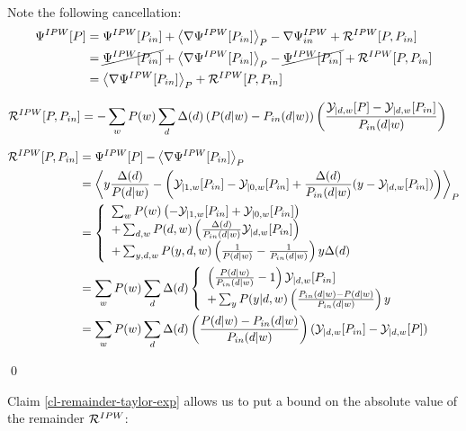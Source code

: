 Note the following cancellation:
\begin{align}
\Psi^{IPW}[P] &=
\Psi^{IPW}[P_{in}]
 + \left\langle\nabla\Psi^{IPW}[P_{in}]\right\rangle_P -\nabla\Psi^{IPW}_{in}
 + {\cal R}^{IPW}[P,P_{in}]
\\
&=
\cancel{\Psi^{IPW}[P_{in}] }
 + \left\langle\nabla\Psi^{IPW}[P_{in}]\right\rangle_P -\cancel{\Psi^{IPW}[P_{in}] }
 + {\cal R}^{IPW}[P,P_{in}]
 \\
&=
 \left\langle\nabla\Psi^{IPW}[P_{in}]\right\rangle_P
 + {\cal R}^{IPW}[P,P_{in}]
\end{align}

\begin{claim}
\label{cl-remainder-taylor-exp}
\begin{align}
{\cal R}^{IPW}[P,P_{in}]&=-
\sum_w P(w)\sum_d \Delta(d)
\left(
P(d|w)-P_{in}(d|w)
\right)
\left(
\frac{
{\cal Y}_{|d,w}[P]-{\cal Y}_{|d,w}[P_{in}]}
{P_{in}(d|w)}
\right)
\end{align}
\end{claim}
\proof

\begin{align}
{\cal R}^{IPW}[P,P_{in}]
&=
\Psi^{IPW}[P]
-\left\langle\nabla\Psi^{IPW}[P_{in}]\right\rangle_P
\\
&=
\left\langle
y \frac{\Delta(d)}{P(d|w)}
-
\left(
{\cal Y}_{|1,w}[P_{in}]
-
{\cal Y}_{|0,w}[P_{in}]
+
\frac{\Delta(d)}{P_{in}(d|w)}
(y-{\cal Y}_{|d,w}[P_{in}])
\right)
\right\rangle_{P}
\\
&=
\left\{
\begin{array}{l}
\sum_w P(w)\left(
-{\cal Y}_{|1,w}[P_{in}]
+
{\cal Y}_{|0,w}[P_{in}]
\right)
\\
+\sum_{d,w} P(d,w) \left(
\frac{\Delta(d)}{P_{in}(d|w)}
{\cal Y}_{|d,w}[P_{in}]
\right)
\\
+\sum_{y,d,w} P(y, d,w)\left(
\frac{1}{P(d|w)}- \frac{1}{P_{in}(d|w)}
\right) y\Delta(d)
\end{array}
\right.
\\
&=\sum_w P(w)\sum_d \Delta(d)
\left\{
\begin{array}{l}
\left(
\frac{P(d|w)}{P_{in}(d|w)}-1
\right)
{\cal Y}_{|d,w}[P_{in}]
\\
+\sum_{y}P(y|d,w)\left(
\frac{P_{in}(d|w)-P(d|w)}{P_{in}(d|w)}
\right) y
\end{array}
\right.
\\
&=
\sum_w P(w)\sum_d \Delta(d)
\left(\frac{P(d|w)-P_{in}(d|w)}{P_{in}(d|w)}
\right)
({\cal Y}_{|d,w}[P_{in}]-
{\cal Y}_{|d,w}[P])
\end{align}

\qed

Claim \ref{cl-remainder-taylor-exp}
allows us to put a bound
on the absolute value of the remainder ${\cal R}^{IPW}$:

